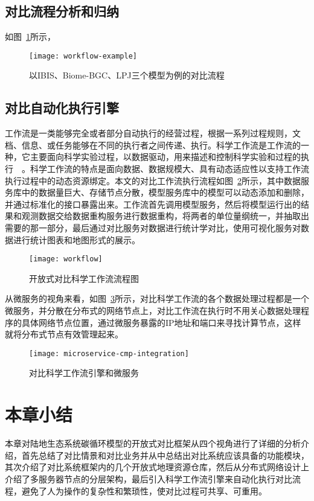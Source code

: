 \subsection{对比流程分析和归纳}
如图~\ref{fig:workflow-example}所示，

\begin{figure}[!htbp]
    \centering
    \texttt{[image: workflow-example]}
    \caption{以IBIS、Biome-BGC、LPJ三个模型为例的对比流程}
    \label{fig:workflow-example}
\end{figure}

\subsection{对比自动化执行引擎}
工作流是一类能够完全或者部分自动执行的经营过程，根据一系列过程规则，文档、信息、或任务能够在不同的执行者之间传递、执行。科学工作流是工作流的一种，它主要面向科学实验过程，以数据驱动，用来描述和控制科学实验和过程的执行~\cite{ludascher2006scientific}~\cite{Zhao2009Special}。科学工作流的特点是面向数据、数据规模大、具有动态适应性以支持工作流执行过程中的动态资源绑定。本文的对比工作流执行流程如图~\ref{fig:workflow}所示，其中数据服务库中的数据量巨大、存储节点分散，模型服务库中的模型可以动态添加和删除，并通过标准化的接口暴露出来。工作流首先调用模型服务，然后将模型运行出的结果和观测数据交给数据重构服务进行数据重构，将两者的单位量纲统一，并抽取出需要的那一部分，最后通过对比服务对数据进行统计学对比，使用可视化服务对数据进行统计图表和地图形式的展示。

\begin{figure}[!htbp]
    \centering
    \texttt{[image: workflow]}
    \caption{开放式对比科学工作流流程图}
    \label{fig:workflow}
\end{figure}

从微服务的视角来看，如图~\ref{fig:microservice-cmp-integration}所示，对比科学工作流的各个数据处理过程都是一个微服务，并分散在分布式的网络节点上，对比工作流在执行时不用关心数据处理程序的具体网络节点位置，通过微服务暴露的IP地址和端口来寻找计算节点，这样就将分布式节点有效管理起来。

\begin{figure}[!htbp]
    \centering
    \texttt{[image: microservice-cmp-integration]}
    \caption{对比科学工作流引擎和微服务}
    \label{fig:microservice-cmp-integration}
\end{figure}


\section{本章小结}
本章对陆地生态系统碳循环模型的开放式对比框架从四个视角进行了详细的分析介绍，首先总结了对比情景和对比业务并从中总结出对比系统应该具备的功能模块，其次介绍了对比系统框架内的几个开放式地理资源仓库，然后从分布式网络设计上介绍了多服务器节点的分层架构，最后引入科学工作流引擎来自动化执行对比流程，避免了人为操作的复杂性和繁琐性，使对比过程可共享、可重用。